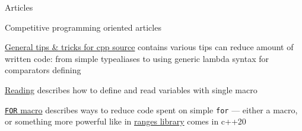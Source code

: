 \begin{cvsection}{Articles}
\begin{rSubsection}{Competitive programming oriented articles}{}{}{}
    \item {\href{https://codeforces.com/blog/entry/79446}{General tips \& tricks for cpp source} contains various tips can reduce amount of written code: from simple typealiases to using generic lambda syntax for comparators defining}

    \item {\href{https://codeforces.com/blog/entry/79066}{Reading} describes how to define and read variables with single macro}

    \item {\href{https://codeforces.com/blog/entry/79100}{\texttt{FOR} macro} describes ways to reduce code spent on simple \texttt{for} --- either a macro, or something more powerful like in \href{https://en.cppreference.com/w/cpp/ranges}{ranges library} comes in c++20}
\end{rSubsection}
\end{cvsection}
